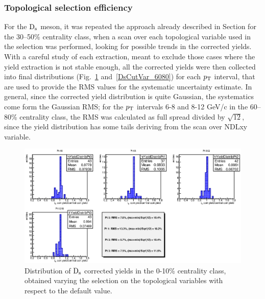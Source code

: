 \subsubsection{Topological selection efficiency}
For the ${\rm D_s}$ meson, it was repeated the approach already described in Section  for the
30--50\% centrality class, when a scan over each topological variable used in the selection was performed,
looking for possible trends in the corrected yields. With a careful study of each extraction, meant to exclude those cases
where the yield extraction is not stable enough, all the corrected yields were then collected into final distributions (Fig.~\ref{DsCutVar_010} and~\ref{DsCutVar_6080}) for each 
$p_{\rm T}$ interval, that are used to provide the RMS values for the systematic uncertainty estimate. In general, since
the corrected yield distribution is quite Gaussian, the systematics come form the Gaussian RMS; for the $p_{\rm T}$
intervals 6-8 and 8-12 GeV/c in the 60--80\% centrality class, the RMS was calculated as full spread divided by $\sqrt{12}$,
since the yield distribution has some tails deriving from the scan over NDLxy variable.
\begin{figure}[!ht]
 \begin{center}
   \includegraphics[angle=0, width=15cm]{./FigCap5/FinalSyst_010.eps}
 \end{center}
 \caption{Distribution of ${\rm D_s}$ corrected yields in the 0-10\% centrality class, obtained varying the selection on the topological variables with respect to the default value.}
 \label{DsCutVar_010} 
\end{figure}

